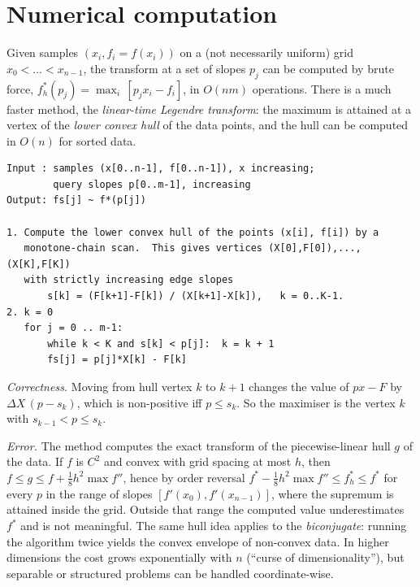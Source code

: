 \section{Numerical computation}\label{sec:numerics}

Given samples $(x_i,f_i=f(x_i))$ on a (not necessarily uniform) grid
$x_0<\dots<x_{n-1}$, the transform at a set of slopes $p_j$ can be computed by
brute force, $f^*_h(p_j)=\max_i\,[p_jx_i-f_i]$, in $O(nm)$ operations.  There is
a much faster method, the \emph{linear-time Legendre transform}:
the maximum is attained at a vertex of the \emph{lower convex hull} of the
data points, and the hull can be computed in $O(n)$ for sorted data.

\begin{lstlisting}
Input : samples (x[0..n-1], f[0..n-1]), x increasing;
        query slopes p[0..m-1], increasing
Output: fs[j] ~ f*(p[j])

1. Compute the lower convex hull of the points (x[i], f[i]) by a
   monotone-chain scan.  This gives vertices (X[0],F[0]),...,(X[K],F[K])
   with strictly increasing edge slopes
       s[k] = (F[k+1]-F[k]) / (X[k+1]-X[k]),   k = 0..K-1.
2. k = 0
   for j = 0 .. m-1:
       while k < K and s[k] < p[j]:  k = k + 1
       fs[j] = p[j]*X[k] - F[k]
\end{lstlisting}

\emph{Correctness.}  Moving from hull vertex $k$ to $k+1$ changes the value of
$px-F$ by $\Delta X\,(p-s_k)$, which is non-positive iff $p\le s_k$.  So the
maximiser is the vertex $k$ with $s_{k-1}<p\le s_k$.

\emph{Error.}  The method computes the exact transform of the piecewise-linear
hull $g$ of the data.  If $f$ is $C^2$ and convex with grid spacing at most
$h$, then $f\le g\le f+\tfrac18h^2\max f''$, hence by order reversal
$f^*-\tfrac18h^2\max f''\le f^*_h\le f^*$ for every $p$ in the range of
slopes $[f'(x_0),f'(x_{n-1})]$, where the supremum is attained inside the grid.
Outside that range the computed value underestimates $f^*$ and is not
meaningful.  The same hull idea applies to the \emph{biconjugate}: running the
algorithm twice yields the convex envelope of non-convex data.  In
higher dimensions the cost grows exponentially with $n$ (``curse of
dimensionality''), but separable or structured problems can be handled
coordinate-wise.

